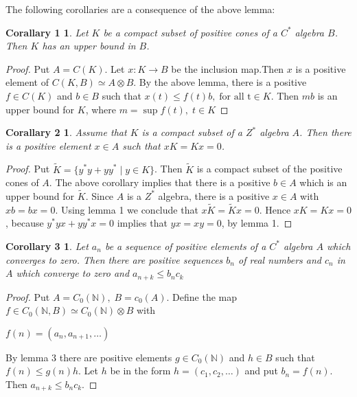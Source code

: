 \documentclass[a4paper,10pt]{amsart}
\theoremstyle{definition}
\theoremstyle{plain}
\newtheorem*{coro1}{Corallary  1}
\newtheorem*{coro2}{Corallary 2 }
\newtheorem*{coro3}{Corollary  3}
\begin{document}
The  following   corollaries  are a consequence of the above lemma:
 \begin{coro1}
 Let $K$  be  a  compact  subset of positive cones of  a  $C^{*}$  algebra $B$. Then $K$ has  an upper bound in $B$.
 \end{coro1}
 \begin{proof}
 Put $A=C(K)$. Let $x:K\rightarrow B$ be  the inclusion map.Then  $x$ is  a positive element of $C(K,B)\simeq A\otimes B$.
 By the  above  lemma, there is  a positive $f\in C(K)$ and  $b\in B$  such that $x(t)\leq f(t)b,\;\text{for all t}\in K$.
 Then $mb$ is  an upper bound  for $K$, where $m=\sup f(t),\;t\in K$
 \end{proof}
 \begin{coro2}
 Assume  that $K$ is  a compact subset   of  a  $Z^{*}$  algebra $A$. Then there  is  a positive  element $x\in A$ such that $xK=Kx=0$.
 \end{coro2}
 \begin{proof}
 Put $\widetilde{K}=\{y^{*}y+ yy^{*} \mid y\in K\}$. Then $\widetilde{K}$ is  a compact  subset of the positive  cones of $A$.
 The  above corollary implies   that there is  a positive   $b\in A$  which is  an upper bound  for $\widetilde{K}$. Since  $A$ is  a $Z^{*}$ algebra, there is  a positive   $x\in A$ with $xb=bx=0$. Using lemma 1 we  conclude  that $x\widetilde{K}=\widetilde{K}x=0$. Hence $xK=Kx=0$, because $y^{*}yx+yy^{*}x=0$ implies that $yx=xy=0$, by lemma 1.

 \end{proof}
 \begin{coro3}
 Let $a_{n}$  be  a  sequence of  positive elements of a $C^{*}$ algebra $A$ which converges to zero. Then there are positive sequences $b_{n}$ of real numbers and $c_{n}$ in $A$ which converge to zero and $a_{n+k}\leq b_{n}c_{k}$
 \end{coro3}
 \begin{proof}
 Put $A=C_{0}(\mathbb{N}),\; B=c_{0}(A)$. Define the  map $f\in C_{0}(\mathbb{N},B)\simeq  C_{0}(\mathbb{N})\otimes B$  with
 \begin{center}
  $f(n)=(a_{n},a_{n+1}, \ldots ) $
  \end{center}
By lemma 3 there are positive  elements $g\in C_{0}(\mathbb{N})$  and  $h\in B$ such that\\
 $f(n)\leq g(n)h$. Let $h$ be  in the  form $h=(c_{1},c_{2},\ldots)$ and put $b_{n}=f(n)$. Then $a_{n+k}\leq b_{n}c_{k}$.
  \end{proof}
\end{document}
